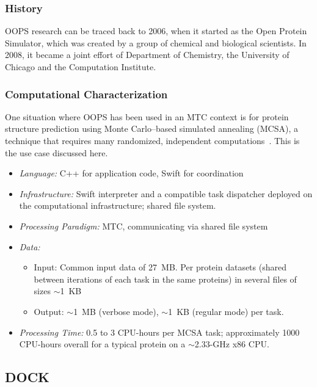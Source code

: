 \documentclass[10pt,letterpaper]{article}
\begin{document}
\subsubsection{History}
OOPS research can be traced back to 2006, when it started
as the Open Protein Simulator, which was
created by a group of chemical and biological scientists. In 2008, it became
a joint effort of Department of Chemistry, the University of Chicago and the Computation
Institute. 

\subsubsection{Computational Characterization}
One situation where OOPS has been used in an MTC context is for protein structure prediction
using Monte Carlo--based simulated annealing (MCSA), a technique that
requires many randomized,
independent computations~\cite{hocky-oops-09}.  This is the
use case discussed here.
\begin {itemize}
\item {\em Language:} C++ for application code, Swift for coordination
\item {\em Infrastructure:} Swift interpreter and a compatible 
        task dispatcher deployed on the computational infrastructure;  
        shared file system.
\item {\em Processing Paradigm:} MTC, communicating via shared file system
\item {\em Data:} \begin{itemize}
    \item   Input: Common input data of 27~MB.  Per protein datasets (shared between iterations
                    of each task in the same proteins) in several files of sizes $\sim$1~KB
    \item Output: $\sim$1~MB (verbose mode), $\sim$1~KB (regular mode) per task. 
    \end{itemize}
\item {\em Processing Time:} 0.5 to 3 CPU-hours per MCSA task; approximately 1000 CPU-hours overall for a typical protein on a $\sim$2.33-GHz x86 CPU.

\end{itemize}

\subsection{DOCK\label{sec:app:dock}}
\end{document}
